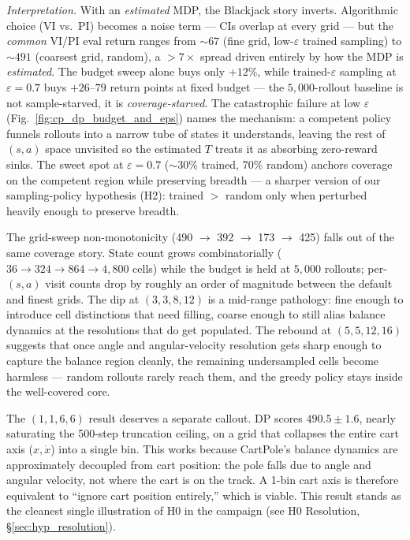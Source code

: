 \documentclass[conference]{IEEEtran}
\begin{document}
\emph{Interpretation.} With an \emph{estimated} MDP, the Blackjack
story inverts. Algorithmic choice (VI vs.\ PI) becomes a noise
term --- CIs overlap at every grid --- but the
\emph{common} VI/PI eval return ranges from $\sim$$67$ (fine grid,
low-$\varepsilon$ trained sampling) to $\sim$$491$ (coarsest grid,
random), a $>$$7\times$ spread driven entirely by how the MDP is
\emph{estimated}. The budget sweep alone buys only $+12\%$, while
trained-$\varepsilon$ sampling at $\varepsilon = 0.7$ buys
$+26$--$79$ return points at fixed budget --- the $5{,}000$-rollout
baseline is not sample-starved, it is \emph{coverage-starved}. The
catastrophic failure at low $\varepsilon$ (Fig.~\ref{fig:cp_dp_budget_and_eps})
names the mechanism: a competent policy funnels rollouts into a
narrow tube of states it understands, leaving the rest of
$(s, a)$ space unvisited so the estimated $T$ treats it as
absorbing zero-reward sinks. The sweet spot at $\varepsilon = 0.7$
($\sim$30\% trained, 70\% random) anchors coverage on the
competent region while preserving breadth --- a sharper version
of our sampling-policy hypothesis (H2): trained $>$ random only
when perturbed heavily enough to preserve breadth.

The grid-sweep non-monotonicity (490 $\to$ 392 $\to$ 173 $\to$ 425)
falls out of the same coverage story. State count grows
combinatorially ($36 \to 324 \to 864 \to 4{,}800$ cells) while the
budget is held at $5{,}000$ rollouts; per-$(s, a)$ visit counts
drop by roughly an order of magnitude between the default and
finest grids. The dip at $(3,3,8,12)$ is a mid-range pathology:
fine enough to introduce cell distinctions that need filling,
coarse enough to still alias balance dynamics at the resolutions
that do get populated. The rebound at $(5,5,12,16)$ suggests that
once angle and angular-velocity resolution gets sharp enough to
capture the balance region cleanly, the remaining undersampled
cells become harmless --- random rollouts rarely reach them, and
the greedy policy stays inside the well-covered core.

The $(1,1,6,6)$ result deserves a separate callout. DP scores
$\mathbf{490.5 \pm 1.6}$, nearly saturating the 500-step truncation
ceiling, on a grid that collapses the entire cart axis ($x,
\dot{x}$) into a single bin. This works because CartPole's
balance dynamics are approximately decoupled from cart position:
the pole falls due to angle and angular velocity, not where the
cart is on the track. A 1-bin cart axis is therefore equivalent
to ``ignore cart position entirely,'' which is viable. This result
stands as the cleanest single illustration of H0 in the campaign
(see H0 Resolution, \S\ref{sec:hyp_resolution}).
\end{document}
